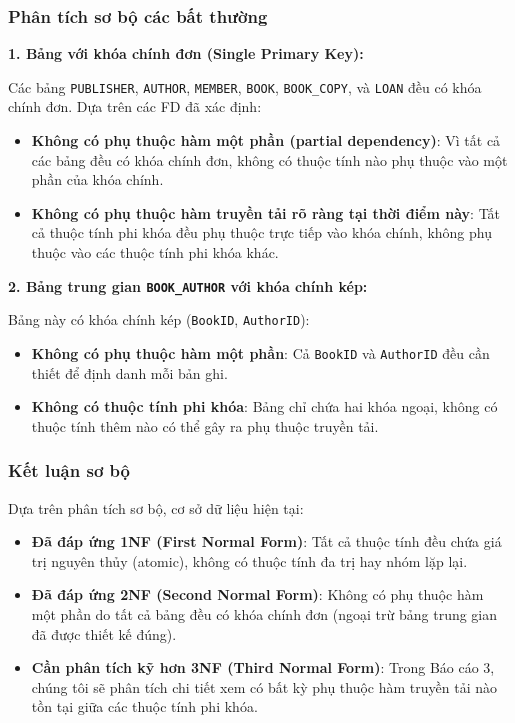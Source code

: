 \documentclass[12pt,a4paper]{article}
\begin{document}
\subsubsection{Phân tích sơ bộ các bất thường}

\textbf{1. Bảng với khóa chính đơn (Single Primary Key):}

Các bảng \texttt{PUBLISHER}, \texttt{AUTHOR}, \texttt{MEMBER}, \texttt{BOOK}, \texttt{BOOK\_COPY}, và \texttt{LOAN} đều có khóa chính đơn. Dựa trên các FD đã xác định:

\begin{itemize}
    \item \textbf{Không có phụ thuộc hàm một phần (partial dependency)}: Vì tất cả các bảng đều có khóa chính đơn, không có thuộc tính nào phụ thuộc vào một phần của khóa chính.
    \item \textbf{Không có phụ thuộc hàm truyền tải rõ ràng tại thời điểm này}: Tất cả thuộc tính phi khóa đều phụ thuộc trực tiếp vào khóa chính, không phụ thuộc vào các thuộc tính phi khóa khác.
\end{itemize}

\textbf{2. Bảng trung gian \texttt{BOOK\_AUTHOR} với khóa chính kép:}

Bảng này có khóa chính kép (\texttt{BookID}, \texttt{AuthorID}):

\begin{itemize}
    \item \textbf{Không có phụ thuộc hàm một phần}: Cả \texttt{BookID} và \texttt{AuthorID} đều cần thiết để định danh mỗi bản ghi.
    \item \textbf{Không có thuộc tính phi khóa}: Bảng chỉ chứa hai khóa ngoại, không có thuộc tính thêm nào có thể gây ra phụ thuộc truyền tải.
\end{itemize}

\subsubsection{Kết luận sơ bộ}

Dựa trên phân tích sơ bộ, cơ sở dữ liệu hiện tại:

\begin{itemize}
    \item \textbf{Đã đáp ứng 1NF (First Normal Form)}: Tất cả thuộc tính đều chứa giá trị nguyên thủy (atomic), không có thuộc tính đa trị hay nhóm lặp lại.
    \item \textbf{Đã đáp ứng 2NF (Second Normal Form)}: Không có phụ thuộc hàm một phần do tất cả bảng đều có khóa chính đơn (ngoại trừ bảng trung gian đã được thiết kế đúng).
    \item \textbf{Cần phân tích kỹ hơn 3NF (Third Normal Form)}: Trong Báo cáo 3, chúng tôi sẽ phân tích chi tiết xem có bất kỳ phụ thuộc hàm truyền tải nào tồn tại giữa các thuộc tính phi khóa.
\end{itemize}
\end{document}
